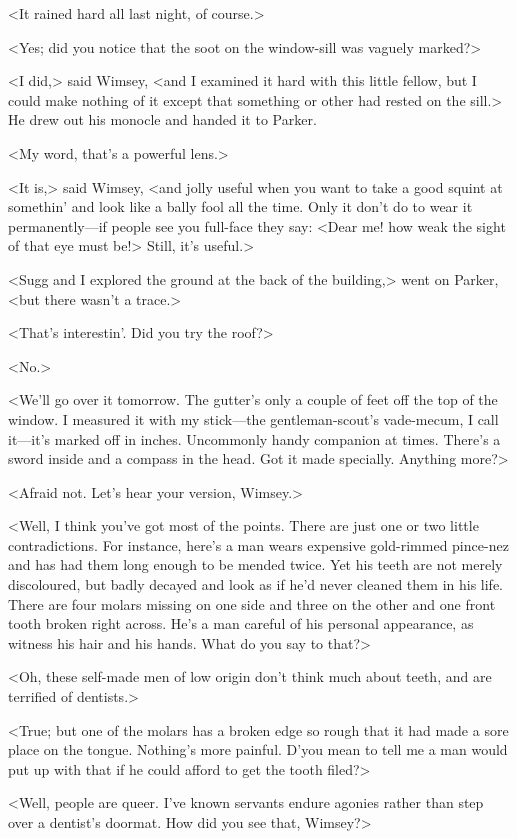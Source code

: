 <It rained hard all last night, of course.>

<Yes; did you notice that the soot on the window-sill was vaguely marked?>

<I did,> said Wimsey, <and I examined it hard with this little fellow, but I could make nothing of it except that something or other had rested on the sill.> He drew out his monocle and handed it to Parker.

<My word, that's a powerful lens.>

<It is,> said Wimsey, <and jolly useful when you want to take a good squint at somethin' and look like a bally fool all the time. Only it don't do to wear it permanently—if people see you full-face they say: <Dear me! how weak the sight of that eye must be!> Still, it's useful.>

<Sugg and I explored the ground at the back of the building,> went on Parker, <but there wasn't a trace.>

<That's interestin'. Did you try the roof?>

<No.>

<We'll go over it tomorrow. The gutter's only a couple of feet off the top of the window. I measured it with my stick—the gentleman-scout's vade-mecum, I call it—it's marked off in inches. Uncommonly handy companion at times. There's a sword inside and a compass in the head. Got it made specially. Anything more?>

<Afraid not. Let's hear your version, Wimsey.>

<Well, I think you've got most of the points. There are just one or two little contradictions. For instance, here's a man wears expensive gold-rimmed pince-nez and has had them long enough to be mended twice. Yet his teeth are not merely discoloured, but badly decayed and look as if he'd never cleaned them in his life. There are four molars missing on one side and three on the other and one front tooth broken right across. He's a man careful of his personal appearance, as witness his hair and his hands. What do you say to that?>

<Oh, these self-made men of low origin don't think much about teeth, and are terrified of dentists.>

<True; but one of the molars has a broken edge so rough that it had made a sore place on the tongue. Nothing's more painful. D'you mean to tell me a man would put up with that if he could afford to get the tooth filed?>

<Well, people are queer. I've known servants endure agonies rather than step over a dentist's doormat. How did you see that, Wimsey?>

